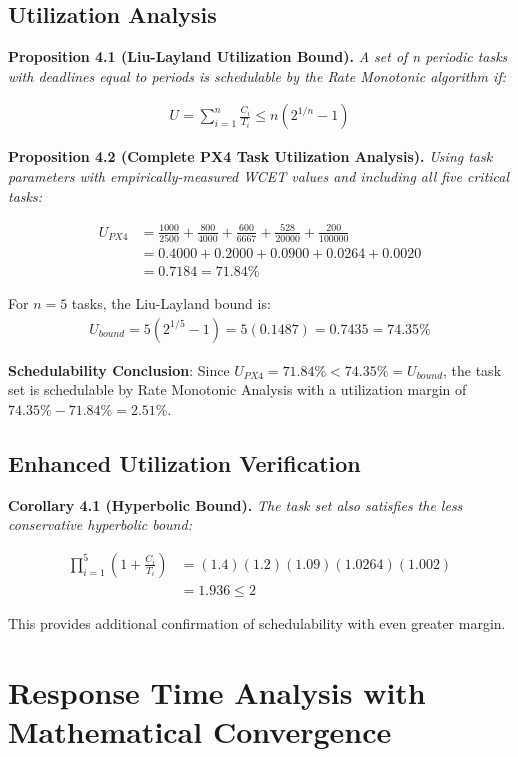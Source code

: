 \documentclass[11pt]{article}
\begin{document}
\subsection{Utilization Analysis}

\textbf{Proposition 4.1 (Liu-Layland Utilization Bound).} \textit{A set of n periodic tasks with deadlines equal to periods is schedulable by the Rate Monotonic algorithm if:}

\begin{align}
U = \sum_{i=1}^{n} \frac{C_i}{T_i} \leq n(2^{1/n} - 1)
\end{align}

\textbf{Proposition 4.2 (Complete PX4 Task Utilization Analysis).} \textit{Using task parameters with empirically-measured WCET values and including all five critical tasks:}

\begin{align}
U_{PX4} &= \frac{1000}{2500} + \frac{800}{4000} + \frac{600}{6667} + \frac{528}{20000} + \frac{200}{100000}\\
&= 0.4000 + 0.2000 + 0.0900 + 0.0264 + 0.0020\\
&= 0.7184 = 71.84\%
\end{align}

For $n=5$ tasks, the Liu-Layland bound is:
\begin{align}
U_{bound} = 5(2^{1/5} - 1) = 5(0.1487) = 0.7435 = 74.35\%
\end{align}

\textbf{Schedulability Conclusion}: Since $U_{PX4} = 71.84\% < 74.35\% = U_{bound}$, the task set is schedulable by Rate Monotonic Analysis with a utilization margin of $74.35\% - 71.84\% = 2.51\%$.

\subsection{Enhanced Utilization Verification}

\textbf{Corollary 4.1 (Hyperbolic Bound).} \textit{The task set also satisfies the less conservative hyperbolic bound:}

\begin{align}
\prod_{i=1}^{5} \left(1 + \frac{C_i}{T_i}\right) &= (1.4)(1.2)(1.09)(1.0264)(1.002)\\
&= 1.936 \leq 2
\end{align}

This provides additional confirmation of schedulability with even greater margin.

\section{Response Time Analysis with Mathematical Convergence}
\end{document}
